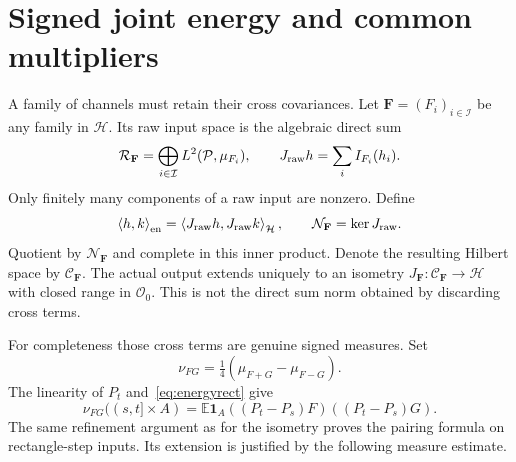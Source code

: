 \documentclass[11pt]{article}
\theoremstyle{remark}\newtheorem{remark}[theorem]{Remark}
\newcommand{\E}{\mathbb E}
\newcommand{\one}{\mathbf1}
\newcommand{\inner}[2]{\left\langle#1,#2\right\rangle}
\newcommand{\HH}{\mathcal H}
\newcommand{\OO}{\mathcal O}
\newcommand{\PP}{\mathcal P}
\begin{document}
\section{Signed joint energy and common multipliers}
A family of channels must retain their cross covariances. Let
$\mathbf F=(F_i)_{i\in\mathcal I}$ be any family in $\HH$. Its raw
input space is the algebraic direct sum
\[
 \mathcal R_{\mathbf F}=\bigoplus_{i\in\mathcal I}L^2(\PP,\mu_{F_i}),
 \qquad J_{\rm raw}h=\sum_i I_{F_i}(h_i).
\]
Only finitely many components of a raw input are nonzero. Define
\begin{equation}\label{eq:jointenergy}
 \inner h k_{\rm en}=\inner{J_{\rm raw}h}{J_{\rm raw}k}_{\HH},
 \qquad \mathcal N_{\mathbf F}=\ker J_{\rm raw}.
\end{equation}
Quotient by $\mathcal N_{\mathbf F}$ and complete in this inner
product. Denote the resulting Hilbert space by $\mathcal C_{\mathbf F}$.
The actual output extends uniquely to an isometry
$J_{\mathbf F}:\mathcal C_{\mathbf F}\to\HH$ with closed range in
$\OO_0$. This is not the direct sum norm obtained by discarding cross
terms.

For completeness those cross terms are genuine signed measures. Set
\[
 \nu_{FG}=\tfrac14(\mu_{F+G}-\mu_{F-G}).
\]
The linearity of $P_t$ and~\eqref{eq:energyrect} give
\[
 \nu_{FG}((s,t]\times A)
  =\E\one_A((P_t-P_s)F)((P_t-P_s)G).
\]
The same refinement argument as for the isometry proves the pairing
formula on rectangle-step inputs. Its extension is justified by the
following measure estimate.
\end{document}
